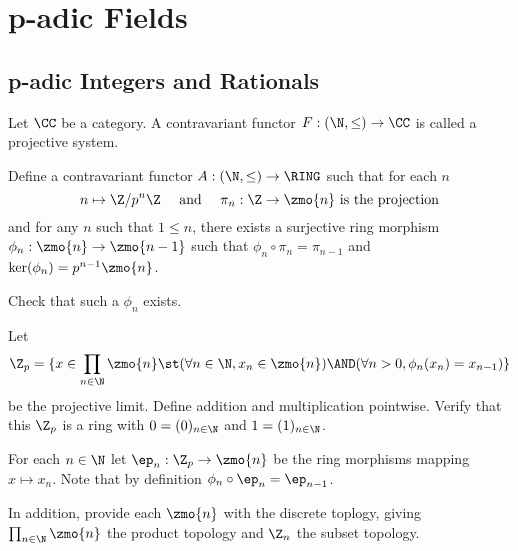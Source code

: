 \chapter{p-adic Fields}
\section{p-adic Integers and Rationals}
\begin{dfn}
    Let $\CC$ be a category.
    A contravariant functor $F : (\N,\le) \to \CC$ 
    is called a projective system.
\end{dfn}

\begin{dfn}
    Define a contravariant functor $A : (\N,\le) \to \RING$ 
    such that for each $n$
    \[n \mapsto \Z / p^n \Z \quad \text{ and } 
    \quad \pi_n : \Z \to \zmo{n} \text{ is the projection}\]
    and for any $n$ such that $1 \le n$, 
    there exists a surjective ring morphism 
    $\phi_n : \zmo{n} \to \zmo{n-1}$ such that
    $\phi_n \circ \pi_n = \pi_{n-1}$ and 
    $\ker(\phi_n) = p^{n-1} \zmo{n}$.
\end{dfn}
\begin{ex}
    Check that such a $\phi_n$ exists.
\end{ex}

\begin{dfn}
    Let 
    \[\Z_p = \{x \in \prod_{n \in \N} \zmo{n} \st 
    (\forall n \in \N, x_n \in \zmo{n}) \AND
    (\forall n > 0, \phi_n(x_n) = x_{n-1})\}\]
    be the projective limit.
    Define addition and multiplication pointwise. 
    Verify that this $\Z_p$ is a ring with $0 = (0)_{n \in \N}$
    and $1 = (1)_{n \in \N}$.

    For each $n \in \N$ let $\ep_n : \Z_p \to \zmo{n}$ be the 
    ring morphisms mapping $x \mapsto x_n$.
    Note that by definition $\phi_n \circ \ep_n = \ep_{n-1}$.

    In addition,
    provide each $\zmo{n}$  with the discrete toplogy,
    giving $\prod_{n \in \N} \zmo{n}$ the product topology
    and $\Z_n$ the subset topology.
\end{dfn}

